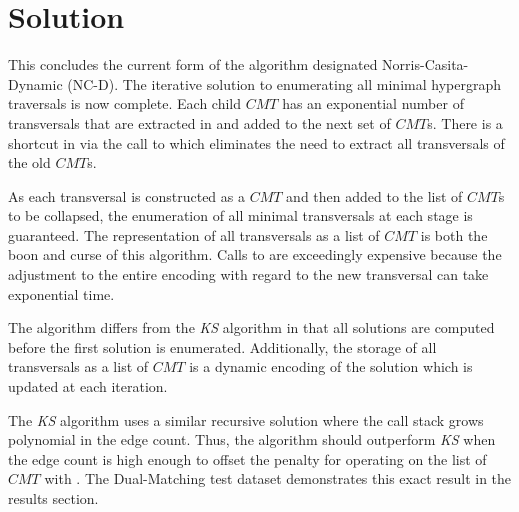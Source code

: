 \newpage
\section{Solution}
This concludes the current form of the algorithm designated Norris-Casita-Dynamic (NC-D). The iterative solution to enumerating all minimal hypergraph traversals is now complete. Each child $CMT$ has an exponential number of transversals that are extracted in  and added to the next set of $CMT$s. There is a shortcut in  via the call to  which eliminates the need to extract all transversals of the old $CMT$s. 

As each transversal is constructed as a $CMT$ and then added to the list of $CMT$s to be collapsed, the enumeration of all minimal transversals at each stage is guaranteed. The representation of all transversals as a list of $CMT$ is both the boon and curse of this algorithm. Calls to  are exceedingly expensive because the adjustment to the entire encoding with regard to the new transversal can take exponential time. 


The algorithm differs from the \emph{KS} algorithm in that all solutions are computed before the first solution is enumerated. Additionally, the storage of all transversals as a list of $CMT$ is a dynamic encoding of the solution which is updated at each iteration. 

The \emph{KS} algorithm uses a similar recursive solution where the call stack grows  polynomial in  the edge count. Thus, the algorithm should outperform \emph{KS} when the edge count is high enough to offset the penalty for operating on the list of $CMT$ with . The Dual-Matching test dataset demonstrates this exact result in the results section. 
